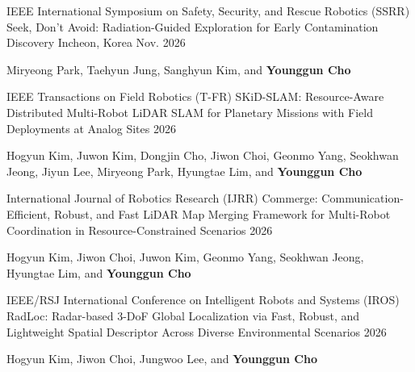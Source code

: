 



\begin{cventries}

  \cventry
    {IEEE International Symposium on Safety, Security, and Rescue Robotics (SSRR)}
    {Seek, Don't Avoid: Radiation-Guided Exploration for Early Contamination Discovery}
    {Incheon, Korea}
    {Nov. 2026}
    {
      \begin{cvitems}
        \item {Miryeong Park, Taehyun Jung, Sanghyun Kim, and \textbf{Younggun Cho}}
      \end{cvitems}
    }


  \cventry
    {IEEE Transactions on Field Robotics (T-FR)} %
    {SKiD-SLAM: Resource-Aware Distributed Multi-Robot LiDAR SLAM for Planetary Missions with Field Deployments at Analog Sites} %
    {} %
    {2026} %
    {
      \begin{cvitems} %
        \item {Hogyun Kim, Juwon Kim, Dongjin Cho, Jiwon Choi, Geonmo Yang, Seokhwan Jeong, Jiyun Lee, Miryeong Park, Hyungtae Lim, and \textbf{Younggun Cho}}
      \end{cvitems}
    }

  \cventry
    {International Journal of Robotics Research (IJRR)} %
    {Commerge: Communication-Efficient, Robust, and Fast LiDAR Map Merging Framework for Multi-Robot Coordination in Resource-Constrained Scenarios} %
    {} %
    {2026} %
    {
      \begin{cvitems} %
        \item {Hogyun Kim, Jiwon Choi, Juwon Kim, Geonmo Yang, Seokhwan Jeong, Hyungtae Lim, and \textbf{Younggun Cho}}
      \end{cvitems}
    }

  \cventry
    {IEEE/RSJ International Conference on Intelligent Robots and Systems (IROS)} %
    {RadLoc: Radar-based 3-DoF Global Localization via Fast, Robust, and Lightweight Spatial Descriptor Across Diverse Environmental Scenarios} %
    {} %
    {2026} %
    {
      \begin{cvitems} %
        \item {Hogyun Kim, Jiwon Choi, Jungwoo Lee, and \textbf{Younggun Cho}}
      \end{cvitems}
    }


\end{cventries}
